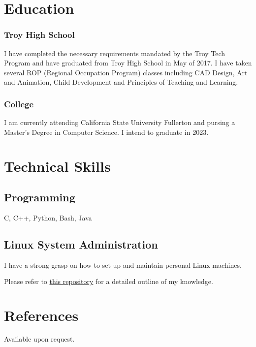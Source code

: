 \documentclass{article}
\begin{document}
\section{Education}

\subsubsection{Troy High School}

I have completed the necessary requirements mandated by the Troy Tech Program and have graduated from Troy High School in May of 2017. I have taken several ROP (Regional Occupation Program) classes including CAD Design, Art and Animation, Child Development and Principles of Teaching and Learning.

\subsubsection{College}

I am currently attending California State University Fullerton and pursing a Master's Degree in Computer Science. I intend to graduate in 2023.

\section{Technical Skills}

\subsection{Programming}
C, C++, Python, Bash, Java

\subsection{Linux System Administration}

I have a strong grasp on how to set up and maintain personal Linux machines.

Please refer to \href{https://github.com/JaredDyreson/Thin-Mint}{this repository} for a detailed outline of my knowledge.

\section{References}

Available upon request.
\end{document}
